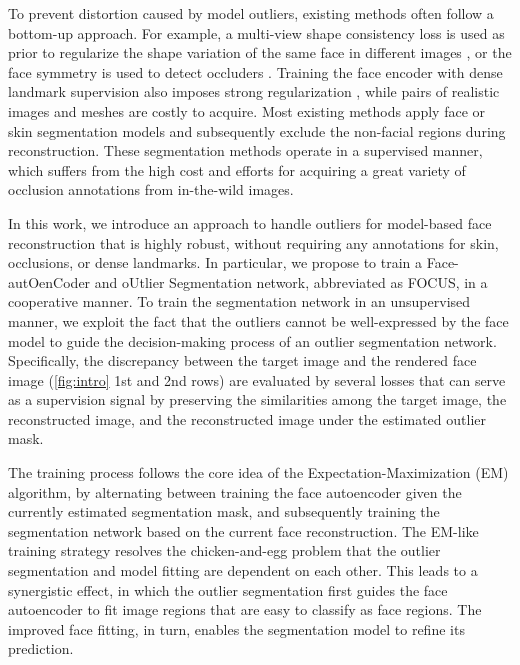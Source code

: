 \documentclass[10pt,twocolumn,letterpaper]{article}
\begin{document}
To prevent distortion caused by model outliers, existing methods often follow a bottom-up approach.
For example, a multi-view shape consistency loss is used as prior to regularize the shape variation of the same face in different images 
\cite{deng2019accurate,DECA,tiwari2022occlusion}, or the face symmetry is used to detect occluders \cite{8578512}. 
Training the face encoder with dense landmark supervision also imposes strong regularization \cite{wood20223d,zielonka2022towards}, while pairs of realistic images and meshes are costly to acquire.
Most existing methods apply face \cite{saito2016real} or skin \cite{deng2019accurate} segmentation models and subsequently exclude the non-facial regions during reconstruction. These segmentation methods operate in a supervised manner, which suffers from the high cost and efforts for acquiring a great variety of occlusion annotations from in-the-wild images.


In this work, we introduce an approach to handle outliers for model-based face reconstruction that is highly robust, without requiring any annotations for skin, occlusions, or dense landmarks.
In particular, we propose to train a Face-autOenCoder and oUtlier Segmentation network, abbreviated as FOCUS, in a cooperative manner.
To train the segmentation network in an unsupervised manner, we exploit the fact that the outliers cannot be well-expressed by the face model to guide the decision-making process of an outlier segmentation network.
Specifically, the discrepancy between the target image and the rendered face image (\cref{fig:intro} 1st and 2nd rows) are evaluated by several losses that can serve as a supervision signal
by preserving the similarities among the target image, the reconstructed image, and the reconstructed image under the estimated outlier mask.



The training process follows the core idea of the Expectation-Maximization (EM) algorithm, by alternating between training the face autoencoder given the currently estimated segmentation mask, and subsequently training the segmentation network based on the current face reconstruction.
The EM-like training strategy resolves the chicken-and-egg problem that the outlier segmentation and model fitting are dependent on each other.
This leads to a synergistic effect, in which the outlier segmentation first guides the face autoencoder to fit image regions that are easy to classify as face regions. The improved face fitting, in turn, enables the segmentation model to refine its prediction.
\end{document}
